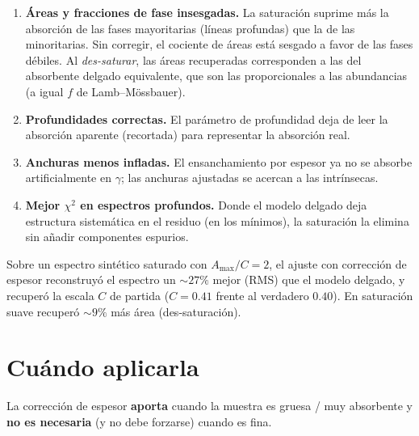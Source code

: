 \documentclass[11pt,a4paper]{article}
\begin{document}
\begin{enumerate}[leftmargin=*]
  \item \textbf{Áreas y fracciones de fase insesgadas.} La saturación suprime más
        la absorción de las fases mayoritarias (líneas profundas) que la de las
        minoritarias. Sin corregir, el cociente de áreas está sesgado a favor de
        las fases débiles. Al \emph{des-saturar}, las áreas recuperadas
        corresponden a las del absorbente delgado equivalente, que son las
        proporcionales a las abundancias (a igual $f$ de Lamb–Mössbauer).
  \item \textbf{Profundidades correctas.} El parámetro de profundidad deja de
        leer la absorción aparente (recortada) para representar la absorción real.
  \item \textbf{Anchuras menos infladas.} El ensanchamiento por espesor ya no se
        absorbe artificialmente en $\gamma$; las anchuras ajustadas se acercan a
        las intrínsecas.
  \item \textbf{Mejor $\chi^2$ en espectros profundos.} Donde el modelo delgado
        deja estructura sistemática en el residuo (en los mínimos), la saturación
        la elimina sin añadir componentes espurios.
\end{enumerate}

\begin{nota}[Verificación]
Sobre un espectro sintético saturado con $A_{\max}/C=2$, el ajuste con corrección
de espesor reconstruyó el espectro un $\sim27\%$ mejor (RMS) que el modelo
delgado, y recuperó la escala $C$ de partida ($C=0.41$ frente al verdadero
$0.40$). En saturación suave recuperó $\sim9\%$ más área (des-saturación).
\end{nota}

\section{Cuándo aplicarla}

\begin{aviso}
La corrección de espesor \textbf{aporta} cuando la muestra es gruesa / muy
absorbente y \textbf{no es necesaria} (y no debe forzarse) cuando es fina.
\end{aviso}
\end{document}
